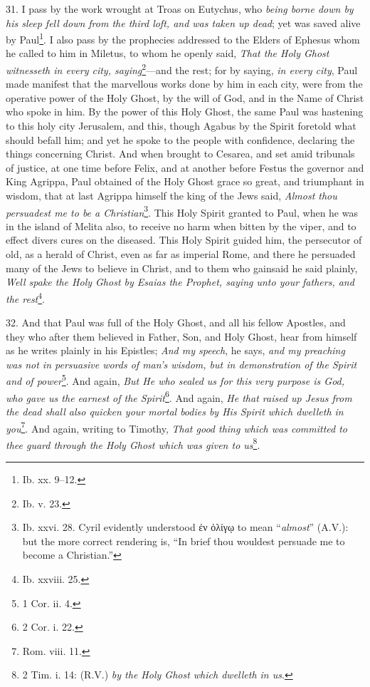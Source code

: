 31. I pass by the work wrought at Troas on Eutychus, who \emph{being borne down by his sleep fell down from the third loft, and was taken up dead}; yet was saved alive by Paul\footnote{Ib. xx. 9–12.}. I also pass by the prophecies addressed to the Elders of Ephesus whom he called to him in Miletus, to whom he openly said, \emph{That the Holy Ghost witnesseth in every city, saying}\footnote{Ib. v. 23.}—and the rest; for by saying, \emph{in every city}, Paul made manifest that the marvellous works done by him in each city, were from the operative power of the Holy Ghost, by the will of God, and in the Name of Christ who spoke in him. By the power of this Holy Ghost, the same Paul was hastening to this holy city Jerusalem, and this, though Agabus by the Spirit foretold what should befall him; and yet he spoke to the people with confidence, declaring the things concerning Christ. And when brought to Cesarea, and set amid tribunals of justice, at one time before Felix, and at another before Festus the governor and King Agrippa, Paul obtained of the Holy Ghost grace so great, and triumphant in wisdom, that at last Agrippa himself the king of the Jews said, \emph{Almost thou persuadest me to be a Christian}\footnote{Ib. xxvi. 28. Cyril evidently understood \textgreek{ἐν ὀλίγῳ} to mean “\emph{almost}” (\textsc{A.V.}): but the more correct rendering is, “In brief thou wouldest persuade me to become a Christian.”}. This Holy Spirit granted to Paul, when he was in the island of Melita also, to receive no harm when bitten by the viper, and to effect divers cures on the diseased. This Holy Spirit guided him, the persecutor of old, as a herald of Christ, even as far as imperial Rome, and there he persuaded many of the Jews to believe in Christ, and to them who gainsaid he said plainly, \emph{Well spake the Holy Ghost by Esaias the Prophet, saying unto your fathers, and the rest}\footnote{Ib. xxviii. 25.}.

32. And that Paul was full of the Holy Ghost, and all his fellow Apostles, and they who after them believed in Father, Son, and Holy Ghost, hear from himself as he writes plainly in his Epistles; \emph{And my speech}, he says, \emph{and my preaching was not in persuasive words of man’s wisdom, but in demonstration of the Spirit and of power}\footnote{1 Cor. ii. 4.}. And again, \emph{But He who sealed us for this very purpose is God, who gave us the earnest of the Spirit}\footnote{2 Cor. i. 22.}. And again, \emph{He that raised up Jesus from the dead shall also quicken your mortal bodies by His Spirit which dwelleth in you}\footnote{Rom. viii. 11.}. And again, writing to Timothy, \emph{That good thing which was committed to thee guard through the Holy Ghost which was given to us}\footnote{2 Tim. i. 14: (R.V.) \emph{by the Holy Ghost which dwelleth in us}.}.

